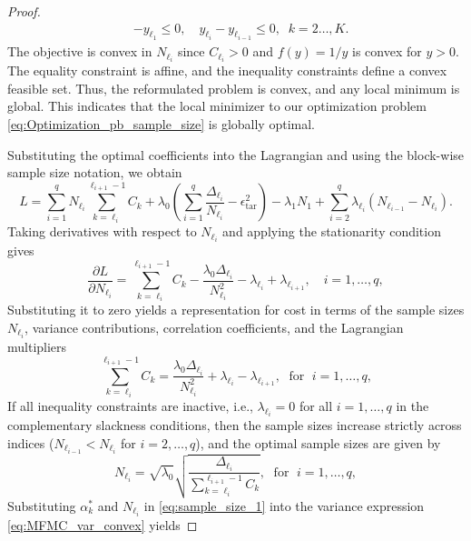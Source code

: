 \begin{proof}
\begin{equation*}
\begin{array}{ll}
       &\displaystyle -y_{\ell_1}\le 0,\quad \displaystyle y_{\ell_i}-y_{\ell_{i-1}}\le 0, \;\; k=2\ldots,K.
    \end{array}
\end{equation*}
%
The objective is convex in $N_{\ell_i}$ since $C_{\ell_i}>0$ and $f(y) = 1/y$ is convex for $y > 0$. The equality constraint is affine, and the inequality constraints define a convex feasible set.  Thus, the reformulated problem is convex, and any local minimum is global. This indicates that the local minimizer to our optimization problem \eqref{eq:Optimization_pb_sample_size} is globally optimal.




Substituting the optimal coefficients into the Lagrangian and using the block-wise sample size notation, we obtain
%
\begin{equation*}
L= \sum_{i=1}^q N_{\ell_i}\sum_{k=\ell_i}^{\ell_{i+1}-1} C_k +\lambda_0 \left( \sum_{i=1}^{q} \frac{\Delta_{\ell_i}}{N_{\ell_i}}- \epsilon_{\text{tar}}^2\right)-\lambda_1 N_1+\sum_{i=2}^q\lambda_{\ell_{i}}(N_{\ell_{i-1}} - N_{\ell_{i}}).
\end{equation*}
%
Taking derivatives with respect to $N_{\ell_i}$ and applying the stationarity condition gives
%
\[
\frac{\partial L}{\partial N_{\ell_i}} =\sum_{k=\ell_i}^{\ell_{i+1}-1} C_{k} -  \frac{\lambda_0\Delta_{\ell_i}}{N_{\ell_i}^2}-\lambda_{\ell_{i}}+\lambda_{\ell_{i+1}},\quad i = 1, \ldots,q,
\]
%
Substituting it to zero yields a representation for cost in terms of the sample sizes $N_{\ell_i}$, variance contributions, correlation coefficients, and the Lagrangian multipliers
%
\begin{equation*}
    \sum_{k=\ell_i}^{\ell_{i+1}-1} C_{k}=\frac{\lambda_0\Delta_{\ell_i}}{N_{\ell_i}^2}+\lambda_{\ell_i}-\lambda_{\ell_{i+1}}, \;\text{ for }\; i=1,\ldots,q, 
\end{equation*}
%
If all inequality constraints are inactive, i.e., $\lambda_{\ell_i} = 0$ for all $i=1,\dots, q$ in the complementary slackness conditions, then the sample sizes increase strictly across indices ($N_{\ell_{i-1}} < N_{\ell_i}$ for $i=2,\ldots, q$), and the optimal sample sizes are given by
%
\begin{equation}\label{eq:sample_size_1}
    N_{\ell_i} = \sqrt{\lambda_0} \sqrt{\frac{\Delta_{\ell_i}}{\sum_{k=\ell_i}^{\ell_{i+1}-1} C_{k}}}, \;\text{ for }\; i=1,\ldots,q,
\end{equation}
%
Substituting $\alpha_k^*$ and $N_{\ell_i}$ in \eqref{eq:sample_size_1} into the variance expression \eqref{eq:MFMC_var_convex} yields

\end{proof}
